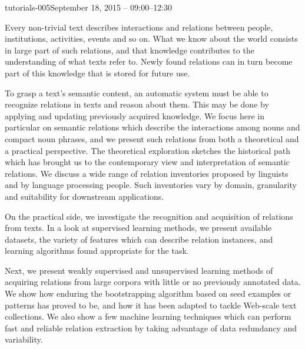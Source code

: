 \begin{tutorial}{tutorials-005}{September 18, 2015 -- 09:00--12:30}
{\TutLocE}

Every non-trivial text describes interactions and relations between
people, institutions, activities, events and so on. What we know about
the world consists in large part of such relations, and that knowledge
contributes to the understanding of what texts refer to. Newly found
relations can in turn become part of this knowledge that is stored
for future use.

To grasp a text’s semantic content, an automatic system must be able
to recognize relations in texts and reason about them. This may be
done by applying and updating previously acquired knowledge. We focus
here in particular on semantic relations which describe the interactions
among nouns and compact noun phrases, and we present such relations
from both a theoretical and a practical perspective. The theoretical
exploration sketches the historical path which has brought us to the
contemporary view and interpretation of semantic relations. We discuss
a wide range of relation inventories proposed by linguists and by
language processing people. Such inventories vary by domain, granularity
and suitability for downstream applications.

On the practical side, we investigate the recognition and acquisition
of relations from texts. In a look at supervised learning methods,
we present available datasets, the variety of features which can describe
relation instances, and learning algorithms found appropriate for
the task.

Next, we present weakly supervised and unsupervised learning methods
of acquiring relations from large corpora with little or no previously
annotated data. We show how enduring the bootstrapping algorithm based
on seed examples or patterns has proved to be, and how it has been
adapted to tackle Web-scale text collections. We also show a few machine
learning techniques which can perform fast and reliable relation extraction
by taking advantage of data redundancy and variability.

\end{tutorial} 

\clearpage{}

